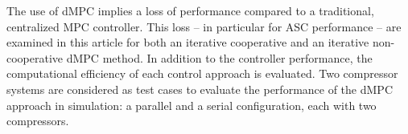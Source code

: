 The use of dMPC implies a loss of performance compared to a traditional, centralized MPC controller.
This loss -- in particular for ASC performance -- are examined in this article for both an iterative cooperative and an iterative non-cooperative dMPC method.
In addition to the controller performance, the computational efficiency of each control approach is evaluated.
Two compressor systems are considered as test cases to evaluate the performance of the dMPC approach in simulation: a parallel and a serial configuration, each with two compressors.
